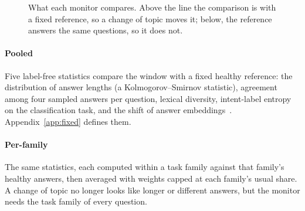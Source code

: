 \documentclass[11pt]{article}
\begin{document}
\begin{figure}[t]
  \centering
  \caption{What each monitor compares. Above the line the comparison is with a
  fixed reference, so a change of topic moves it; below, the reference answers the
  same questions, so it does not.}
  \label{fig:what}
\end{figure}

\paragraph{Pooled} Five label-free statistics compare the window with a fixed
healthy reference: the distribution of answer lengths (a Kolmogorov--Smirnov
statistic), agreement among four sampled answers per question, lexical diversity,
intent-label entropy on the classification task, and the shift of answer
embeddings~\citep{nussbaum2024nomic}. Appendix~\ref{app:fixed} defines them.

\paragraph{Per-family} The same statistics, each computed within a task family
against that family's healthy answers, then averaged with weights capped at each
family's usual share. A change of topic no longer looks like longer or different
answers, but the monitor needs the task family of every question.
\end{document}
